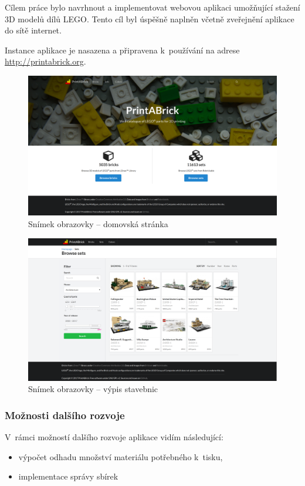 Cílem práce bylo navrhnout a implementovat webovou aplikaci umožňující stažení 3D modelů dílů LEGO. Tento cíl byl úspěšně naplněn včetně zveřejnění aplikace do sítě internet. 

Instance aplikace je nasazena a připravena k~používání na adrese \url{http://printabrick.org}. 


\begin{figure}[htbp]
    \centering
    \includegraphics[width=\textwidth,height=\textheight,keepaspectratio]{images/screenshot-homepage.png}
    \caption{Snímek obrazovky – domovská stránka\label{facebook-share}}
\end{figure}

\begin{figure}[htbp]
    \centering
    \includegraphics[width=\textwidth,height=\textheight,keepaspectratio]{images/screenshot-sets.png}
    \caption{Snímek obrazovky – výpis stavebnic\label{facebook-share}}
\end{figure}

\subsubsection*{Možnosti dalšího rozvoje}\label{moznosti-dalsiho-rozvoje}

V~rámci možností dalšího rozvoje aplikace vidím následující:
\begin{itemize}
    \item výpočet odhadu množství materiálu potřebného k~tisku,
    \item implementace správy sbírek 
\end{itemize} 
